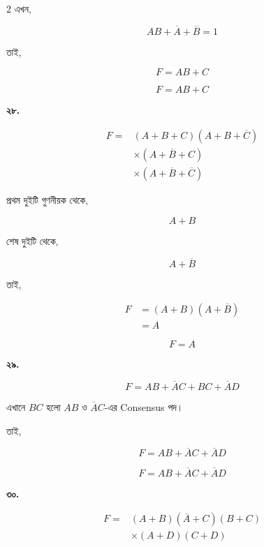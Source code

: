 \begin{multicols}{2}
এখন,

\[
AB+\overline A+\overline B=1
\]

তাই,

\[
F=AB+C
\]

\[
\boxed{F=AB+C}
\]

\medskip


\textbf{২৮.}

\[
\begin{aligned}
F
={}&(A+B+C)(A+B+\overline C)\\
&\times(A+\overline B+C)\\
&\times(A+\overline B+\overline C)
\end{aligned}
\]

প্রথম দুইটি গুণনীয়ক থেকে,

\[
A+B
\]

শেষ দুইটি থেকে,

\[
A+\overline B
\]

তাই,

\[
\begin{aligned}
F
&=(A+B)(A+\overline B)\\
&=A
\end{aligned}
\]

\[
\boxed{F=A}
\]

\medskip


\textbf{২৯.}

\[
F=AB+\overline AC+BC+\overline AD
\]

এখানে \(BC\) হলো \(AB\) ও \(\overline AC\)-এর
\textenglish{Consensus} পদ।

তাই,

\[
F=AB+\overline AC+\overline AD
\]

\[
\boxed{F=AB+\overline AC+\overline AD}
\]

\medskip


\textbf{৩০.}

\[
\begin{aligned}
F
={}&(A+B)(\overline A+C)(B+C)\\
&\times(A+D)(C+D)
\end{aligned}
\]


\end{multicols}

